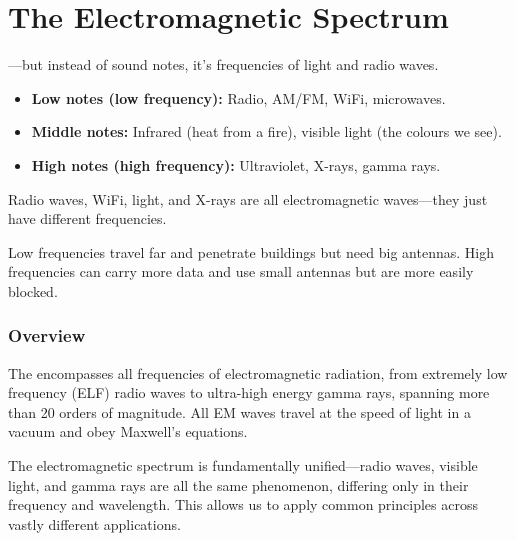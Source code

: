 
\chapter{The Electromagnetic Spectrum}
\label{ch:spectrum}

\begin{nontechnical}
    ---but instead of sound notes, it's frequencies of light and radio waves.

    \begin{itemize}
        \item \textbf{Low notes (low frequency):} Radio, AM/FM, WiFi, microwaves.
        \item \textbf{Middle notes:} Infrared (heat from a fire), visible light (the colours we see).
        \item \textbf{High notes (high frequency):} Ultraviolet, X-rays, gamma rays.
    \end{itemize}

     Radio waves, WiFi, light, and X-rays are all electromagnetic waves---they just have different frequencies.

     Low frequencies travel far and penetrate buildings but need big antennas. High frequencies can carry more data and use small antennas but are more easily blocked.
\end{nontechnical}

\subsection{Overview}

The  encompasses all frequencies of electromagnetic radiation, from extremely low frequency (ELF) radio waves to ultra-high energy gamma rays, spanning more than 20 orders of magnitude. All EM waves travel at the speed of light in a vacuum and obey Maxwell's equations.

\begin{keyconcept}
    The electromagnetic spectrum is fundamentally unified---radio waves, visible light, and gamma rays are all the same phenomenon, differing only in their frequency and wavelength. This allows us to apply common principles across vastly different applications.
\end{keyconcept}

